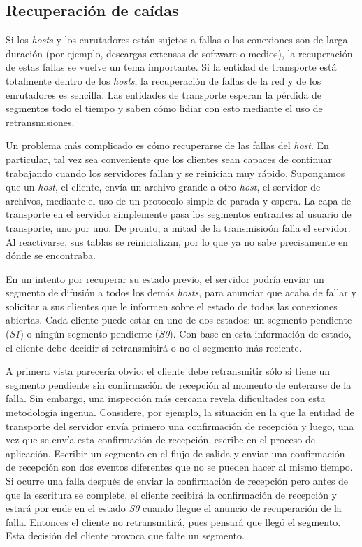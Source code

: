\documentclass[10pt,a4paper]{report}
\begin{document}
\subsection{Recuperación de caídas}

	\par Si los \textit{hosts} y los enrutadores están sujetos a fallas o las conexiones son de larga duración (por ejemplo, descargas extensas de software o medios), la recuperación de estas fallas se vuelve un tema importante. Si la entidad de transporte está totalmente dentro de los \textit{hosts}, la recuperación de fallas de la red y de los enrutadores es sencilla. Las entidades de transporte esperan la pérdida de segmentos todo el tiempo y saben cómo lidiar con esto mediante el uso de retransmisiones.

	\par Un problema más complicado es cómo recuperarse de las fallas del \textit{host}. En particular, tal vez sea conveniente que los clientes sean capaces de continuar trabajando cuando los servidores fallan y se reinician muy rápido. Supongamos que un \textit{host}, el cliente, envía un archivo grande a otro \textit{host}, el servidor de archivos, mediante el uso de un protocolo simple de parada y espera. La capa de transporte en el servidor simplemente pasa los segmentos entrantes al usuario de transporte, uno por uno. De pronto, a mitad de la transmisioón falla el servidor. Al reactivarse, sus tablas se reinicializan, por lo que ya no sabe precisamente en dónde se encontraba.

	\par En un intento por recuperar su estado previo, el servidor podría enviar un segmento de difusión a todos los demás \textit{hosts}, para anunciar que acaba de fallar y solicitar a sus clientes que le informen sobre el estado de todas las conexiones abiertas. Cada cliente puede estar en uno de dos estados: un segmento pendiente (\textit{S1}) o ningún segmento pendiente (\textit{S0}). Con base en esta información de estado, el cliente debe decidir si retransmitirá o no el segmento más reciente.
	
	\par A primera vista parecería obvio: el cliente debe retransmitir sólo si tiene un segmento pendiente sin confirmación de recepción al momento de enterarse de la falla. Sin embargo, una inspección más cercana revela dificultades con esta metodología ingenua. Considere, por ejemplo, la situación en la que la entidad de transporte del servidor envía primero una confirmación de recepción y luego, una vez que se envía esta confirmación de recepción, escribe en el proceso de aplicación. Escribir un segmento en el flujo de salida y enviar una confirmación de recepción son dos eventos diferentes que no se pueden hacer al mismo tiempo. Si ocurre una falla después de enviar la confirmación de recepción pero antes de que la escritura se complete, el cliente recibirá la confirmación de recepción y estará por ende en el estado \textit{S0} cuando llegue el anuncio de recuperación de la falla. Entonces el cliente no retransmitirá, pues pensará que llegó el segmento. Esta decisión del cliente provoca que falte un segmento.
	
\end{document}
